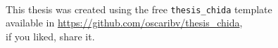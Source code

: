 \texttt{   }  
  
  \vfill

\begin{center}
\footnotesize{
This thesis was created using the free \texttt{thesis\_chida} template \\
available in \url{https://github.com/oscaribv/thesis_chida}, \\
if you liked, share it.
}
\end{center}
